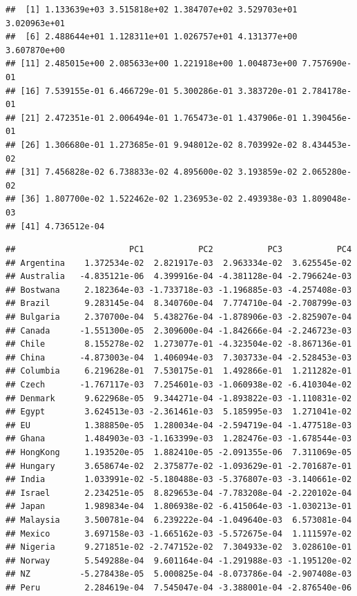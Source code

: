 \documentclass[11pt,preprint, authoryear]{elsarticle}
\numberwithin{equation}{section}
\numberwithin{figure}{section}
\numberwithin{table}{section}
\begin{document}
\begin{verbatim}
##  [1] 1.133639e+03 3.515818e+02 1.384707e+02 3.529703e+01 3.020963e+01
##  [6] 2.488644e+01 1.128311e+01 1.026757e+01 4.131377e+00 3.607870e+00
## [11] 2.485015e+00 2.085633e+00 1.221918e+00 1.004873e+00 7.757690e-01
## [16] 7.539155e-01 6.466729e-01 5.300286e-01 3.383720e-01 2.784178e-01
## [21] 2.472351e-01 2.006494e-01 1.765473e-01 1.437906e-01 1.390456e-01
## [26] 1.306680e-01 1.273685e-01 9.948012e-02 8.703992e-02 8.434453e-02
## [31] 7.456828e-02 6.738833e-02 4.895600e-02 3.193859e-02 2.065280e-02
## [36] 1.807700e-02 1.522462e-02 1.236953e-02 2.493938e-03 1.809048e-03
## [41] 4.736512e-04
\end{verbatim}

\begin{verbatim}
##                       PC1           PC2           PC3           PC4
## Argentina    1.372534e-02  2.821917e-03  2.963334e-02  3.625545e-02
## Australia   -4.835121e-06  4.399916e-04 -4.381128e-04 -2.796624e-03
## Bostwana     2.182364e-03 -1.733718e-03 -1.196885e-03 -4.257408e-03
## Brazil       9.283145e-04  8.340760e-04  7.774710e-04 -2.708799e-03
## Bulgaria     2.370700e-04  5.438276e-04 -1.878906e-03 -2.825907e-04
## Canada      -1.551300e-05  2.309600e-04 -1.842666e-04 -2.246723e-03
## Chile        8.155278e-02  1.273077e-01 -4.323504e-02 -8.867136e-01
## China       -4.873003e-04  1.406094e-03  7.303733e-04 -2.528453e-03
## Columbia     6.219628e-01  7.530175e-01  1.492866e-01  1.211282e-01
## Czech       -1.767117e-03  7.254601e-03 -1.060938e-02 -6.410304e-02
## Denmark      9.622968e-05  9.344271e-04 -1.893822e-03 -1.110831e-02
## Egypt        3.624513e-03 -2.361461e-03  5.185995e-03  1.271041e-02
## EU           1.388850e-05  1.280034e-04 -2.594719e-04 -1.477518e-03
## Ghana        1.484903e-03 -1.163399e-03  1.282476e-03 -1.678544e-03
## HongKong     1.193520e-05  1.882410e-05 -2.091355e-06  7.311069e-05
## Hungary      3.658674e-02  2.375877e-02 -1.093629e-01 -2.701687e-01
## India        1.033991e-02 -5.180488e-03 -5.376807e-03 -3.140661e-02
## Israel       2.234251e-05  8.829653e-04 -7.783208e-04 -2.220102e-04
## Japan        1.989834e-04  1.806938e-02 -6.415064e-03 -1.030213e-01
## Malaysia     3.500781e-04  6.239222e-04 -1.049640e-03  6.573081e-04
## Mexico       3.697158e-03 -1.665162e-03 -5.572675e-04  1.111597e-02
## Nigeria      9.271851e-02 -2.747152e-02  7.304933e-02  3.028610e-01
## Norway       5.549288e-04  9.601164e-04 -1.291988e-03 -1.195120e-02
## NZ          -5.278438e-05  5.000825e-04 -8.073786e-04 -2.907408e-03
## Peru         2.284619e-04  7.545047e-04 -3.388001e-04 -2.876540e-06

\end{verbatim}
\end{document}
